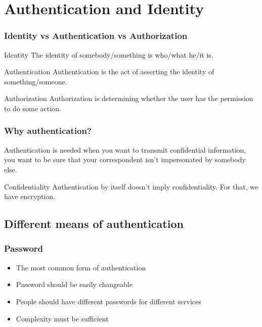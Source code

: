 \section{Authentication and Identity}

\begin{frame}
\sectionpage
\end{frame}

\begin{frame}
\frametitle{Identity vs Authentication vs Authorization}
\begin{block}{Identity}
The identity of somebody/something is who/what he/it is.
\end{block}
\begin{block}{Authentication}
Authentication is the act of asserting the identity of something/someone.
\end{block}
\begin{block}{Authorization}
Authorization is determining whether the user has the permission to do some
action.
\end{block}
\end{frame}

\begin{frame}
\frametitle{Why authentication?}
Authentication is needed when you want to transmit confidential
information, you want to be sure that your correspondent isn't
impersonated by somebody else.
\begin{block}{Confidentiality}
Authentication by itself doesn't imply confidentiality.
For that, we have encryption.
\end{block}
\end{frame}

\subsection{Different means of authentication}

\begin{frame}
\frametitle{Password}

\begin{itemize}
\item The most common form of authentication
\item Password should be easily changeable
\item People should have different passwords for different services
\item Complexity must be sufficient
\end{itemize}
\end{frame}


